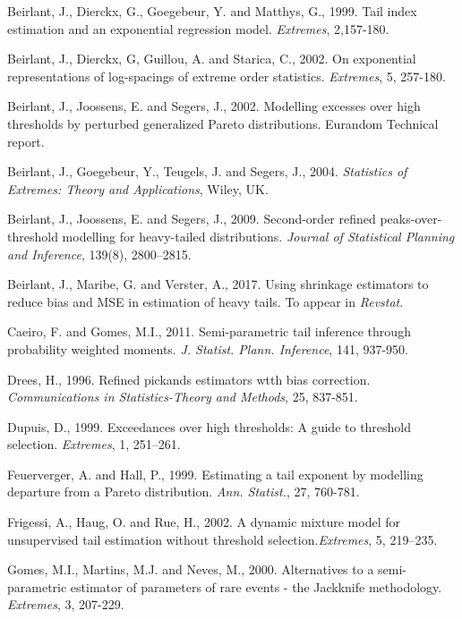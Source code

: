 \documentclass[a4paper,11pt]{article}
\begin{document}
\begin{thebibliography}{99}
Beirlant, J., Dierckx, G., Goegebeur, Y. and  Matthys, G., 1999. Tail index estimation and an exponential regression model. {\it Extremes}, 2,157-180.

Beirlant, J., Dierckx, G, Guillou, A. and Starica, C., 2002. On exponential representations of log-spacings of extreme order statistics. {\it Extremes}, 5, 257-180.

Beirlant, J., Joossens, E. and Segers, J., 2002. Modelling excesses over high thresholds by perturbed generalized Pareto distributions. Eurandom Technical report.

Beirlant, J., Goegebeur, Y., Teugels, J. and Segers, J., 2004. {\it Statistics of Extremes: Theory and Applications}, Wiley, UK.

Beirlant, J., Joossens, E. and Segers, J., 2009.
 Second-order refined peaks-over-threshold modelling for heavy-tailed distributions. {\it Journal of Statistical Planning and Inference}, 139(8), 2800--2815.
 
Beirlant, J., Maribe, G. and Verster, A., 2017. Using shrinkage estimators to reduce bias and MSE in estimation of heavy tails. 
To appear in {\it Revstat}.

Caeiro, F. and Gomes, M.I., 2011. Semi-parametric tail inference through probability weighted moments. {\it J. Statist. Plann. Inference}, 141, 937-950.

Drees, H., 1996. Refined pickands estimators wtth bias correction. {\it Communications in Statistics-Theory and Methods}, 25, 837-851.
 
 Dupuis, D., 1999. Exceedances over  high thresholds: A guide to threshold selection. {\it Extremes}, 1, 251--261.
 
Feuerverger, A. and Hall, P., 1999. Estimating a tail exponent by modelling departure from a Pareto distribution. {\it Ann. Statist.}, 27, 760-781.  
 
Frigessi, A., Haug, O.  and Rue, H., 2002.
  A dynamic mixture model for unsupervised tail estimation without threshold selection.{\it Extremes}, 5, 219--235.
  
  Gomes, M.I., Martins, M.J. and Neves, M., 2000. Alternatives to a semi-parametric estimator of parameters  of rare events - the Jackknife methodology. {\it Extremes}, 3, 207-229.
  

\end{thebibliography}
\end{document}
